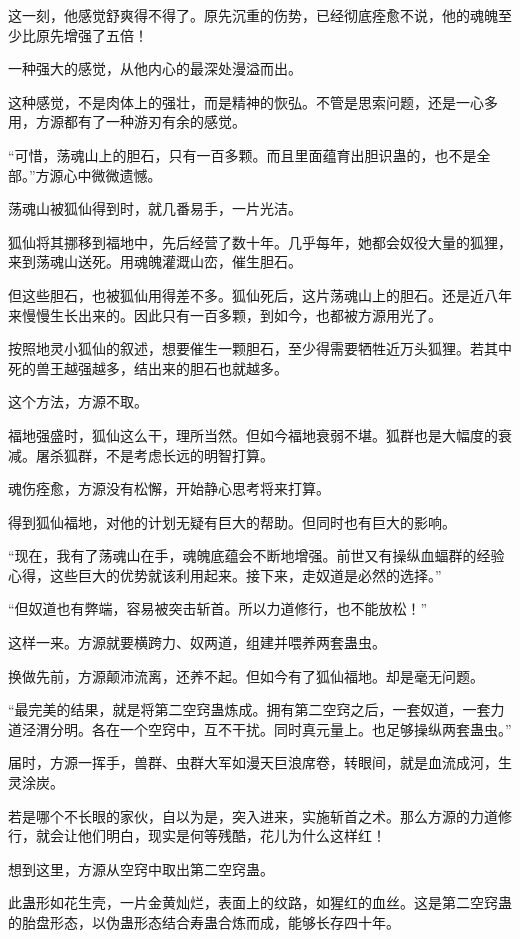 \begin{this_body}
这一刻，他感觉舒爽得不得了。原先沉重的伤势，已经彻底痊愈不说，他的魂魄至少比原先增强了五倍！

一种强大的感觉，从他内心的最深处漫溢而出。

这种感觉，不是肉体上的强壮，而是精神的恢弘。不管是思索问题，还是一心多用，方源都有了一种游刃有余的感觉。

“可惜，荡魂山上的胆石，只有一百多颗。而且里面蕴育出胆识蛊的，也不是全部。”方源心中微微遗憾。

荡魂山被狐仙得到时，就几番易手，一片光洁。

狐仙将其挪移到福地中，先后经营了数十年。几乎每年，她都会奴役大量的狐狸，来到荡魂山送死。用魂魄灌溉山峦，催生胆石。

但这些胆石，也被狐仙用得差不多。狐仙死后，这片荡魂山上的胆石。还是近八年来慢慢生长出来的。因此只有一百多颗，到如今，也都被方源用光了。

按照地灵小狐仙的叙述，想要催生一颗胆石，至少得需要牺牲近万头狐狸。若其中死的兽王越强越多，结出来的胆石也就越多。

这个方法，方源不取。

福地强盛时，狐仙这么干，理所当然。但如今福地衰弱不堪。狐群也是大幅度的衰减。屠杀狐群，不是考虑长远的明智打算。

魂伤痊愈，方源没有松懈，开始静心思考将来打算。

得到狐仙福地，对他的计划无疑有巨大的帮助。但同时也有巨大的影响。

“现在，我有了荡魂山在手，魂魄底蕴会不断地增强。前世又有操纵血蝠群的经验心得，这些巨大的优势就该利用起来。接下来，走奴道是必然的选择。”

“但奴道也有弊端，容易被突击斩首。所以力道修行，也不能放松！”

这样一来。方源就要横跨力、奴两道，组建并喂养两套蛊虫。

换做先前，方源颠沛流离，还养不起。但如今有了狐仙福地。却是毫无问题。

“最完美的结果，就是将第二空窍蛊炼成。拥有第二空窍之后，一套奴道，一套力道泾渭分明。各在一个空窍中，互不干扰。同时真元量上。也足够操纵两套蛊虫。”

届时，方源一挥手，兽群、虫群大军如漫天巨浪席卷，转眼间，就是血流成河，生灵涂炭。

若是哪个不长眼的家伙，自以为是，突入进来，实施斩首之术。那么方源的力道修行，就会让他们明白，现实是何等残酷，花儿为什么这样红！

想到这里，方源从空窍中取出第二空窍蛊。

此蛊形如花生壳，一片金黄灿烂，表面上的纹路，如猩红的血丝。这是第二空窍蛊的胎盘形态，以伪蛊形态结合寿蛊合炼而成，能够长存四十年。


\end{this_body}
